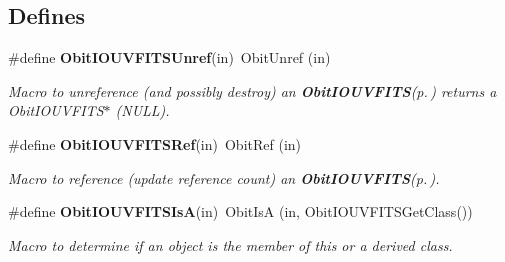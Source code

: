 \subsection*{Defines}
\begin{CompactItemize}
\item 
\#define {\bf Obit\-IOUVFITSUnref}(in)\ Obit\-Unref (in)
\begin{CompactList}\small\item\em Macro to unreference (and possibly destroy) an {\bf Obit\-IOUVFITS}{\rm (p.\,\pageref{structObitIOUVFITS})} returns a Obit\-IOUVFITS$\ast$ (NULL). \item\end{CompactList}\item 
\#define {\bf Obit\-IOUVFITSRef}(in)\ Obit\-Ref (in)
\begin{CompactList}\small\item\em Macro to reference (update reference count) an {\bf Obit\-IOUVFITS}{\rm (p.\,\pageref{structObitIOUVFITS})}. \item\end{CompactList}\item 
\#define {\bf Obit\-IOUVFITSIs\-A}(in)\ Obit\-Is\-A (in, Obit\-IOUVFITSGet\-Class())
\begin{CompactList}\small\item\em Macro to determine if an object is the member of this or a derived class. \item\end{CompactList}\end{CompactItemize}
